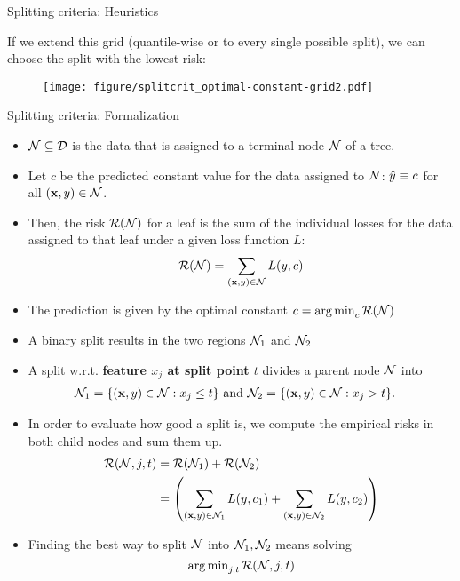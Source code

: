 \documentclass[11pt,compress,t,notes=noshow, xcolor=table]{beamer}
\begin{document}
\begin{vbframe}{Splitting criteria: Heuristics}

If we extend this grid (quantile-wise or to every single possible split), we can choose the split with the lowest risk:

\begin{figure}
\texttt{[image: figure/splitcrit\_optimal-constant-grid2.pdf]} 
\end{figure}


\end{vbframe}

\begin{vbframe}{Splitting criteria: Formalization}

\begin{itemize}
\item $\mathcal{N} \subseteq \mathcal{D}$ is the data that is assigned to a terminal node $\mathcal{N}$ of a tree.
\item Let $c$ be the predicted constant value for the data assigned to $\mathcal{N}$: $\hat{y} \equiv c$ for all $\left(\mathbf{x}, y\right) \in \mathcal{N}$.
\item Then, the risk $\mathcal{R}(\mathcal{N})$ for a leaf is the sum of the individual losses for the data assigned to that leaf under a given loss function $L$:
  $$\mathcal{R}(\mathcal{N}) = \sum\limits_{(\mathbf{x}, y) \in \mathcal{N}} L(y, c)$$
\item The prediction is given by the optimal constant $c = \operatorname{arg\,min}_c \mathcal{R}(\mathcal{N})$
\item A binary split results in the two regions $\mathcal{N}_1$ and $\mathcal{N}_2$
\end{itemize}

\framebreak

\begin{itemize}
\item A split w.r.t. \textbf{feature $x_j$ at split point $t$} divides a parent node $\mathcal{N}$ into 
  \begin{align*}
    \mathcal{N}_1 &= \{ (\mathbf{x}, y) \in \mathcal{N}: x_j \leq t \} \text{ and } \mathcal{N}_2 = \{ (\mathbf{x}, y) \in \mathcal{N}: x_j > t \}.
  \end{align*}
\item   
  In order to evaluate how good a split is, we compute the empirical risks
  in both child nodes and sum them up.
     \begin{align*}
      \mathcal{R}(\mathcal{N}, j, t) &=  \mathcal{R}(\mathcal{N}_1) +  \mathcal{R}(\mathcal{N}_2) \\
                  &= \left(\sum\limits_{(\mathbf{x},y) \in \mathcal{N}_1} L(y, c_1) + \sum\limits_{(\mathbf{x},y) \in \mathcal{N}_2} L(y, c_2)\right)
      \end{align*}
  \item Finding the best way to split $\mathcal{N}$ into $\mathcal{N}_1, \mathcal{N}_2$ means solving
  $$\operatorname{arg\,min}_{j, t} \mathcal{R}(\mathcal{N}, j, t)$$
\end{itemize}


\end{vbframe}
\end{document}
